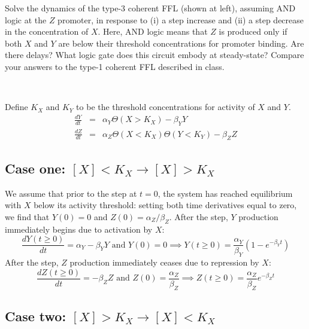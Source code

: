 \documentclass{article}
\begin{document}
\hspace{0.5cm}
\begin{minipage}[b]{0.85\linewidth}
Solve the dynamics of the type-3 coherent FFL (shown at left), assuming AND logic at the $Z$ promoter, in response to (i) a step increase and (ii) a step decrease in the concentration of $X$. Here, AND logic means that $Z$ is produced only if both $X$ and $Y$ are below their threshold concentrations for promoter binding. Are there delays? What logic gate does this circuit embody at steady-state? Compare your answers to the type-1 coherent FFL described in class.\\

\end{minipage}\\
{\color{red}
Define $K_X$ and $K_Y$ to be the threshold concentrations for activity of $X$ and $Y$.
\begin{eqnarray*}
\frac{dY}{dt} & = & \alpha_Y \Theta \left( X > K_ X \right) - \beta_Y Y\\ 
\frac{dZ}{dt} & = & \alpha_Z \Theta \left( X < K_ X \right) \Theta \left( Y < K_ Y \right) - \beta_Z Z
\end{eqnarray*}

\subsection*{Case one: $[X]<K_X \to [X] > K_X$}

We assume that prior to the step at $t=0$, the system has reached equilibrium with $X$ below its activity threshold: setting both time derivatives equal to zero, we find that $Y(0)=0$ and $Z(0) = \alpha_Z/\beta_Z$. After the step, $Y$ production immediately begins due to activation by $X$:
\[ \frac{dY(t \geq 0)}{dt} = \alpha_Y - \beta_Y Y \textrm{ and } Y(0) = 0  \implies Y(t \geq 0) = \frac{\alpha_Y}{\beta_Y} \left( 1 - e^{-\beta_Y t} \right) \]
After the step, $Z$ production immediately ceases due to repression by $X$:
\[ \frac{dZ(t \geq 0)}{dt} = - \beta_Z Z \textrm{ and } Z(0) = \frac{\alpha_Z}{\beta_Z} \implies Z(t \geq 0) = \frac{\alpha_Z}{\beta_Z} e^{-\beta_Z t} \]

\subsection*{Case two: $[X]>K_X \to [X] < K_X$}

}
\end{document}
